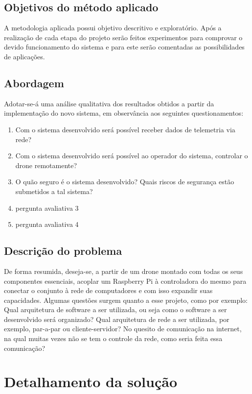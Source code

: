 \documentclass[12pt,a4paper,oneside]{book}
\begin{document}
\section{Objetivos do método aplicado}
A metodologia aplicada possui objetivo descritivo e exploratório. Após a realização de cada etapa do projeto serão feitos experimentos para comprovar o devido funcionamento do sistema e para este serão comentadas as possibilidades de aplicações.

\section{Abordagem}
Adotar-se-á uma análise qualitativa dos resultados obtidos a partir da implementação do novo sistema, em observância aos seguintes questionamentos:
\begin{enumerate}
    \item Com o sistema desenvolvido será possível receber dados de telemetria via rede?
    \item Com o sistema desenvolvido será possível ao operador do sistema, controlar o drone remotamente?
    \item O quão seguro é o sistema desenvolvido? Quais riscos de segurança estão submetidos a tal sistema?
    \item pergunta avaliativa 3
    \item pergunta avaliativa 4
\end{enumerate}
%
%

\section{Descrição do problema}
De forma resumida, deseja-se, a partir de um drone montado com todas os seus componentes essenciais, acoplar um Raspberry Pi à controladora do mesmo para conectar o conjunto à rede de computadores e com isso expandir suas capacidades. Algumas questões surgem quanto a esse projeto, como por exemplo: Qual arquitetura de software a ser utilizada, ou seja como o software a ser desenvolvido será organizado? Qual arquitetura de rede a ser utilizada, por exemplo, par-a-par ou cliente-servidor? No quesito de comunicação na internet, na qual muitas vezes não se tem o controle da rede, como seria feita essa comunicação?

%
\chapter{Detalhamento da solução}
%
\thispagestyle{empty} 
%
\end{document}
